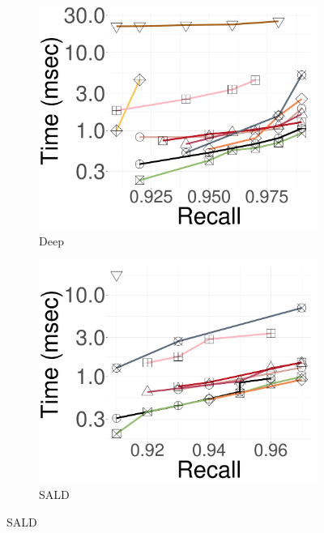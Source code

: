 \begin{figure}[!htb]
\begin{minipage}{\textwidth}
		\begin{subfigure}{\soneM\textwidth}
  \centering
			\includegraphics[width=\textwidth]{../img/Experiments/search/25/deep_10nn.pdf}
			\caption{Deep}  
		\label{fig:elpis:query:performance:25GB:deep:10NN}
		\end{subfigure}
   \hspace{0.4cm}
		\begin{subfigure}{\soneM\textwidth}
  \centering
			\includegraphics[width=\textwidth]{../img/Experiments/search/25/sald_10nn.pdf}
			\caption{SALD}  
		\label{fig:elpis:query:performance:25GB:sald:10NN}
		\end{subfigure}

\end{minipage}
\end{figure}
